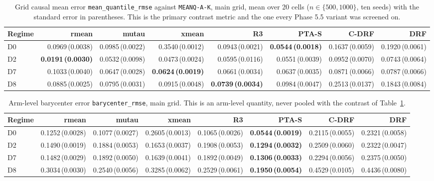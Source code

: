 \begin{table}[htbp]
\centering
\caption{Grid causal mean error \texttt{mean\_quantile\_rmse} against \texttt{MEANQ-A-K}, main grid, mean over 20 cells ($n\in\{500,1000\}$, ten seeds) with the standard error in parentheses. This is the primary contrast metric and the one every Phase 5.5 variant was screened on.}
\label{tab:p55-meanq}
\scriptsize
\setlength{\tabcolsep}{3.2pt}
\begin{tabular}{@{}lrrrrrrr@{}}
\toprule
Regime & rmean & mutau & xmean & R3 & PTA-S & C-DRF & DRF \\
\midrule
D0 & 0.0969\,(0.0038) & 0.0985\,(0.0022) & 0.3540\,(0.0012) & 0.0943\,(0.0021) & \textbf{0.0544\,(0.0018)} & 0.1637\,(0.0059) & 0.1920\,(0.0061) \\
D2 & \textbf{0.0191\,(0.0030)} & 0.0532\,(0.0098) & 0.0473\,(0.0024) & 0.0595\,(0.0116) & 0.0551\,(0.0039) & 0.0952\,(0.0070) & 0.0743\,(0.0064) \\
D7 & 0.1033\,(0.0040) & 0.0647\,(0.0028) & \textbf{0.0624\,(0.0019)} & 0.0661\,(0.0034) & 0.0637\,(0.0035) & 0.0871\,(0.0066) & 0.0787\,(0.0066) \\
D8 & 0.0885\,(0.0025) & 0.0795\,(0.0031) & 0.0915\,(0.0048) & \textbf{0.0739\,(0.0034)} & 0.0984\,(0.0047) & 0.2513\,(0.0137) & 0.1843\,(0.0084) \\
\bottomrule
\end{tabular}
\end{table}

\begin{table}[htbp]
\centering
\caption{Arm-level barycenter error \texttt{barycenter\_rmse}, main grid. This is an arm-level quantity, never pooled with the contrast of Table~\ref{tab:p55-meanq}.}
\label{tab:p55-bary}
\scriptsize
\setlength{\tabcolsep}{3.2pt}
\begin{tabular}{@{}lrrrrrrr@{}}
\toprule
Regime & rmean & mutau & xmean & R3 & PTA-S & C-DRF & DRF \\
\midrule
D0 & 0.1252\,(0.0028) & 0.1077\,(0.0027) & 0.2605\,(0.0013) & 0.1065\,(0.0026) & \textbf{0.0544\,(0.0019)} & 0.2115\,(0.0055) & 0.2321\,(0.0058) \\
D2 & 0.1490\,(0.0019) & 0.1884\,(0.0053) & 0.1653\,(0.0037) & 0.1908\,(0.0053) & \textbf{0.1294\,(0.0032)} & 0.2509\,(0.0060) & 0.2322\,(0.0047) \\
D7 & 0.1482\,(0.0029) & 0.1892\,(0.0050) & 0.1639\,(0.0041) & 0.1892\,(0.0049) & \textbf{0.1306\,(0.0033)} & 0.2294\,(0.0056) & 0.2375\,(0.0050) \\
D8 & 0.3034\,(0.0030) & 0.2540\,(0.0056) & 0.3285\,(0.0062) & 0.2529\,(0.0061) & \textbf{0.1950\,(0.0054)} & 0.4529\,(0.0105) & 0.4436\,(0.0080) \\
\bottomrule
\end{tabular}
\end{table}

